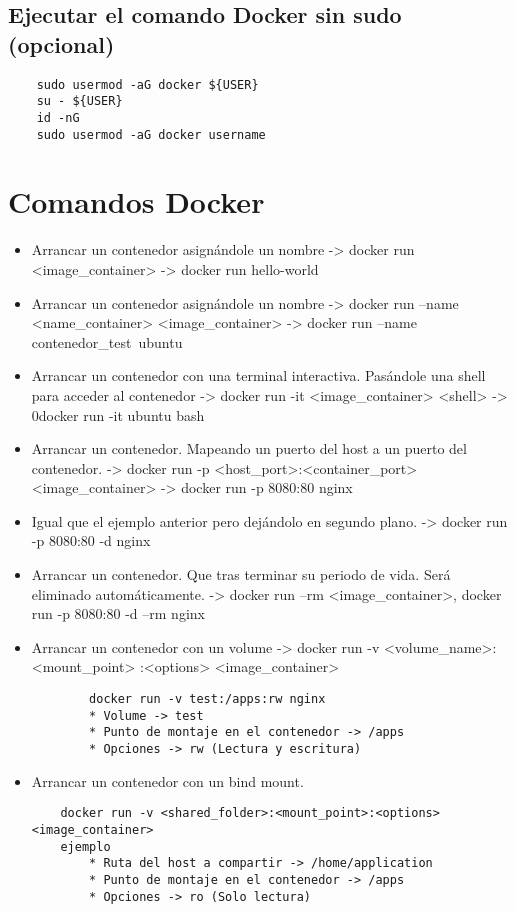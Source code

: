 \documentclass{article}
\begin{document}
\subsection{Ejecutar el comando Docker sin sudo (opcional)}

\begin{lstlisting}
    sudo usermod -aG docker ${USER}
    su - ${USER}
    id -nG
    sudo usermod -aG docker username

\end{lstlisting}

\section{Comandos Docker}\label{comansDocker}

\begin{itemize}
    \item Arrancar un contenedor asignándole un nombre -> docker run <image\_container> -> docker run hello-world
    \item Arrancar un contenedor asignándole un nombre -> docker run --name <name\_container> <image\_container> -> docker run --name contenedor\_test\ ubuntu 
    \item Arrancar un contenedor con una terminal interactiva. Pasándole una shell para acceder al contenedor -> docker run -it <image\_container> <shell> -> 0docker run -it ubuntu bash
    \item Arrancar un contenedor. Mapeando un puerto del host a un puerto del contenedor. -> docker run -p <host\_port>:<container\_port> <image\_container> -> docker run -p 8080:80 nginx 
    \item Igual que el ejemplo anterior pero dejándolo en segundo plano. -> docker run -p 8080:80 -d nginx
    \item Arrancar un contenedor. Que tras terminar su periodo de vida. Será eliminado automáticamente. -> docker run --rm <image\_container>, docker run -p 8080:80 -d --rm nginx
    \item Arrancar un contenedor con un volume -> docker run -v <volume\_name>:<mount\_point>
    :<options> <image\_container>
    \begin{lstlisting}
        docker run -v test:/apps:rw nginx
        * Volume -> test
        * Punto de montaje en el contenedor -> /apps
        * Opciones -> rw (Lectura y escritura)
    \end{lstlisting}
    \item Arrancar un contenedor con un bind mount. 
    \begin{lstlisting}
    docker run -v <shared_folder>:<mount_point>:<options> <image_container>
    ejemplo
        * Ruta del host a compartir -> /home/application
        * Punto de montaje en el contenedor -> /apps
        * Opciones -> ro (Solo lectura)


\end{lstlisting}
\end{itemize}
\end{document}
